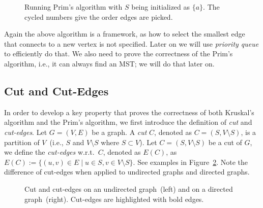 \documentclass[letterpaper,11pt]{article}
\theoremstyle{mytheorem}
\begin{document}
\begin{figure}[h]
\centering{}
\caption{Running Prim's algorithm with $S$ being initialized as $\{a\}$. The cycled numbers give the order edges are picked.}
\label{fig:mst2}
\end{figure}


Again the above algorithm is a framework, as how to select the
smallest edge that connects to a new vertex is not specified. 
Later on we will use \emph{priority queue} to efficiently do that.
We also need to prove the correctness of the Prim's algorithm, i.e., it can always find
an MST; we will do that later on.


\subsection*{Cut and Cut-Edges}

In order to develop a key property that proves the correctness of both Kruskal's algorithm
and the Prim's algorithm, we first introduce the definition of \emph{cut} and \emph{cut-edges}.
Let $G = (V, E)$ be a graph. A \emph{cut} $C$, denoted as $C = (S, V\setminus S)$,
is a partition of $V$~(i.e., $S$ and $V\setminus S$ where $S\subset V$).
Let $C = (S, V\setminus S)$ be a cut of $G$, we define the \emph{cut-edges} w.r.t.\ $C$,
denoted as $E(C)$, as $E(C) := \{(u,v)\in E\mid u\in S, v\in V\setminus S\}$.
See examples in Figure~\ref{fig:cut}.  Note the difference of cut-edges
when applied to undirected graphs and directed graphs.

\begin{figure}[h]
\centering{}
\caption{Cut and cut-edges on an undirected graph~(left) and on a directed graph~(right).
Cut-edges are highlighted with bold edges.}
\label{fig:cut}
\end{figure}
\end{document}
